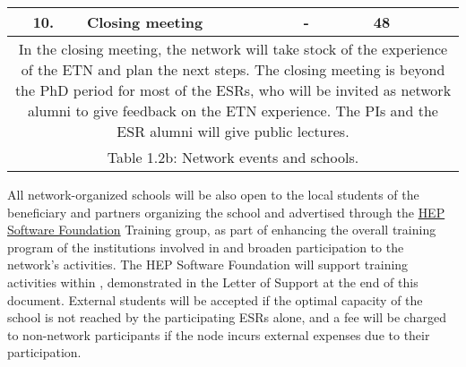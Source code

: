 \begin{center}
\begin{tabular}{@{}|c|p{45mm}|p{7mm}|p{30mm}|p{15mm}|p{45mm}|@{}}
				\cellcolor{red!70!black} 10. & \textbf{Closing meeting} & - & \heidelbergentity & 48  \tabularnewline\midrule
				\multicolumn{6}{|p{0.975\textwidth}|}{					
In the closing meeting, the network will take stock of the experience of the ETN and plan the next steps. 
The closing meeting is beyond the PhD period for most of the ESRs, who will be invited as network alumni to give feedback on the ETN experience. The PIs and the ESR alumni will give public lectures. 
				} \tabularnewline \hline %
				\multicolumn{6}{p{0.975\textwidth}}{
				Table 1.2b: Network events and schools.  
				}		
			\end{tabular}
\end{center}
All network-organized schools will be also open to the local students of the beneficiary and partners organizing the school and advertised through the \href{http://hepsoftwarefoundation.org}{HEP Software Foundation} Training group, as part of enhancing the overall training program of the institutions involved in \acronym and broaden participation to the network's activities. 
The HEP Software Foundation will support training activities within \acronym, demonstrated in the Letter of Support at the end of this document. 
External students will be accepted if the optimal capacity of the school is not reached by the participating ESRs alone, and a fee will be charged to non-network participants if the node incurs external expenses due to their participation. 

